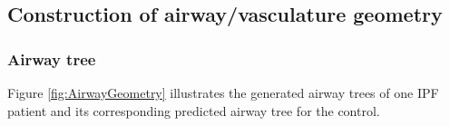 
\subsection{Construction of airway/vasculature geometry}
\subsubsection{Airway tree}
Figure \ref{fig:AirwayGeometry} illustrates the generated airway trees of one IPF patient and its corresponding predicted airway tree for the control. 

